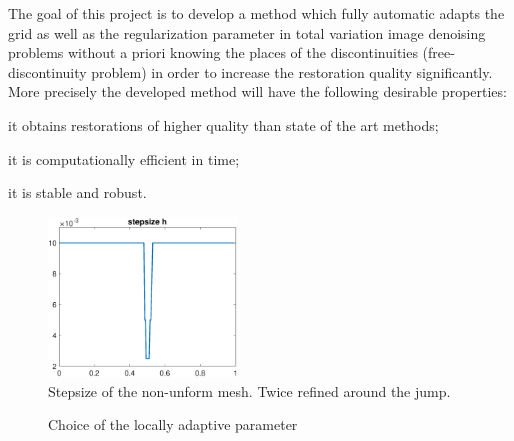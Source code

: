 \documentclass[enabledeprecatedfontcommands,cleardoublepage=empty,headsepline,twoside,11pt,DIV=15,BCOR=12mm,final]{scrartcl}
\begin{document}
 The goal of this project is to develop a method which fully automatic adapts the grid as well as the regularization parameter in total variation image denoising problems without a priori knowing the places of the discontinuities (free-discontinuity problem) in order to increase the restoration quality significantly. More precisely the developed method will have the following desirable properties: 
\begin{inparaenum}[(i)]
\item it obtains restorations of higher quality than state of the art methods;
\item it is computationally efficient in time;
\item it is stable and robust.
\end{inparaenum}
\begin{figure}
\begin{center}
\includegraphics[width=5cm]{stepsize}
\caption{Stepsize of the non-unform mesh. Twice refined around the jump.}\label{fig:stepsize}
\end{center}
\end{figure}
\begin{figure}
\begin{center}
\hspace{0.2cm}
\caption{Choice of the locally adaptive parameter}\label{fig:lamdba}
\end{center}
\end{figure}
\end{document}
